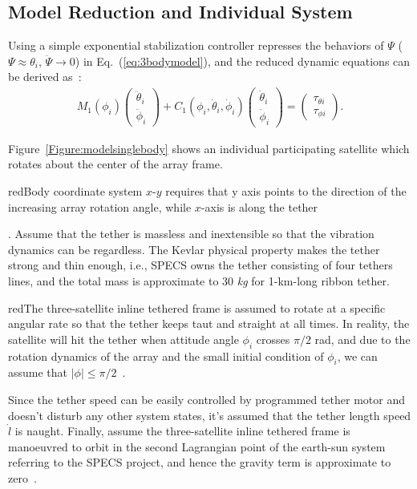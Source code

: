 \subsection{Model Reduction and Individual System}
Using a simple exponential stabilization controller represses the behaviors of $\Psi$ ($\Psi\approx\theta_i$, $\ddot\Psi\rightarrow 0$) in Eq.~(\ref{eq:3bodymodel}), and the reduced dynamic equations can be derived as~\cite{chung2007nonlinear,huang2015nonlinear}:
\begin{align}
M_1(\phi_i)
\begin{pmatrix}
\ddot{\theta}_i\\
\ddot{\phi}_i
\end{pmatrix}
+C_1(\phi_i,\dot{\theta}_i,\dot{\phi}_i)
\begin{pmatrix}
\dot{\theta}_i\\
\dot{\phi}_i
\end{pmatrix}
=
\begin{pmatrix}
\tau_{\theta i}\\
\tau_{\phi i}
\end{pmatrix}.\label{eq:3bodyreduce}
\end{align}\par
Figure~\ref{Figure:modelsinglebody} shows an individual participating satellite which rotates about the center of the array frame. \begin{color}{red}Body coordinate system $x$-$y$ requires that y axis points to the direction of the increasing array rotation angle, while $x$-axis is along the tether\end{color}. Assume that the tether is massless and inextensible so that the vibration dynamics can be regardless. The Kevlar physical property makes the tether strong and thin enough, i.e., SPECS owns the tether consisting of four tethers lines, and the total mass is approximate to 30 \textit{kg} for 1-km-long ribbon tether\cite{chung2007nonlinear1}. \begin{color}{red}The three-satellite inline tethered frame is assumed to rotate at a specific angular rate so that the tether keeps taut and straight at all times. In reality, the satellite will hit the tether when attitude angle $\phi_i$ crosses $\pi/2$ rad, and due to the rotation dynamics of the array and the small initial condition of $\phi_i$, we can assume that $\vert \phi\vert\le \pi/2$~\cite{chung2007nonlinear1}.\end{color}  Since the tether speed can be easily controlled by programmed tether motor and doesn't disturb any other system states, it's assumed that the tether length speed $\dot l$ is naught. Finally, assume the three-satellite inline tethered frame is manoeuvred to orbit in the second Lagrangian point of the earth-sun system referring to the SPECS project, and hence the gravity term is approximate to zero~\cite{lorenzini2006far}.\par
